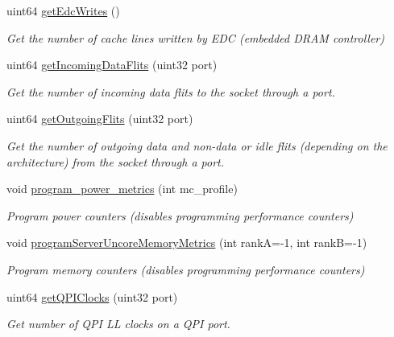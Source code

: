 \begin{DoxyCompactItemize}
\mbox{\label{class_server_p_c_i_c_f_g_uncore_a1cdc322032c84f2eaeb36328c8d6ec0b}} 
uint64 \mbox{\hyperlink{class_server_p_c_i_c_f_g_uncore_a1cdc322032c84f2eaeb36328c8d6ec0b}{get\+Edc\+Writes}} ()
\begin{DoxyCompactList}\small\item\em Get the number of cache lines written by E\+DC (embedded D\+R\+AM controller) \end{DoxyCompactList}\item 
uint64 \mbox{\hyperlink{class_server_p_c_i_c_f_g_uncore_abaeb0a56fa35ecbd0c092b733a1f923b}{get\+Incoming\+Data\+Flits}} (uint32 port)
\begin{DoxyCompactList}\small\item\em Get the number of incoming data flits to the socket through a port. \end{DoxyCompactList}\item 
uint64 \mbox{\hyperlink{class_server_p_c_i_c_f_g_uncore_ac318caa49f90d9cf3ee335656aa1f623}{get\+Outgoing\+Flits}} (uint32 port)
\begin{DoxyCompactList}\small\item\em Get the number of outgoing data and non-\/data or idle flits (depending on the architecture) from the socket through a port. \end{DoxyCompactList}\item 
void \mbox{\hyperlink{class_server_p_c_i_c_f_g_uncore_af53af91d9172cd124e455e500d6c5622}{program\+\_\+power\+\_\+metrics}} (int mc\+\_\+profile)
\begin{DoxyCompactList}\small\item\em Program power counters (disables programming performance counters) \end{DoxyCompactList}\item 
void \mbox{\hyperlink{class_server_p_c_i_c_f_g_uncore_a55caf03764268f7696fb8a2c8f3cc8f4}{program\+Server\+Uncore\+Memory\+Metrics}} (int rankA=-\/1, int rankB=-\/1)
\begin{DoxyCompactList}\small\item\em Program memory counters (disables programming performance counters) \end{DoxyCompactList}\item 
uint64 \mbox{\hyperlink{class_server_p_c_i_c_f_g_uncore_ae5bc4e8e1003ed74fdd3c641e6ac78a5}{get\+Q\+P\+I\+Clocks}} (uint32 port)
\begin{DoxyCompactList}\small\item\em Get number of Q\+PI LL clocks on a Q\+PI port. \end{DoxyCompactList}\item 

\end{DoxyCompactItemize}
